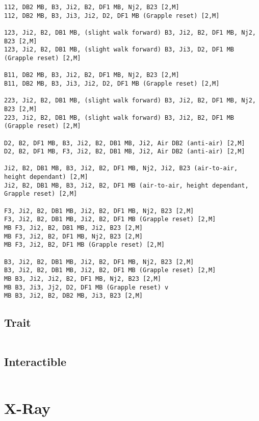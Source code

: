 \documentclass[main.tex]{subfiles}
\begin{document}
\begin{lstlisting}[language=FG]
112, DB2 MB, B3, Ji2, B2, DF1 MB, Nj2, B23 [2,M]
112, DB2 MB, B3, Ji3, Ji2, D2, DF1 MB (Grapple reset) [2,M]

123, Ji2, B2, DB1 MB, (slight walk forward) B3, Ji2, B2, DF1 MB, Nj2, B23 [2,M]
123, Ji2, B2, DB1 MB, (slight walk forward) B3, Ji3, D2, DF1 MB (Grapple reset) [2,M]

B11, DB2 MB, B3, Ji2, B2, DF1 MB, Nj2, B23 [2,M]
B11, DB2 MB, B3, Ji3, Ji2, D2, DF1 MB (Grapple reset) [2,M]

223, Ji2, B2, DB1 MB, (slight walk forward) B3, Ji2, B2, DF1 MB, Nj2, B23 [2,M]
223, Ji2, B2, DB1 MB, (slight walk forward) B3, Ji2, B2, DF1 MB (Grapple reset) [2,M]

D2, B2, DF1 MB, B3, Ji2, B2, DB1 MB, Ji2, Air DB2 (anti-air) [2,M]
D2, B2, DF1 MB, F3, Ji2, B2, DB1 MB, Ji2, Air DB2 (anti-air) [2,M]

Ji2, B2, DB1 MB, B3, Ji2, B2, DF1 MB, Nj2, Ji2, B23 (air-to-air, height dependant) [2,M]
Ji2, B2, DB1 MB, B3, Ji2, B2, DF1 MB (air-to-air, height dependant, Grapple reset) [2,M]

F3, Ji2, B2, DB1 MB, Ji2, B2, DF1 MB, Nj2, B23 [2,M]
F3, Ji2, B2, DB1 MB, Ji2, B2, DF1 MB (Grapple reset) [2,M]
MB F3, Ji2, B2, DB1 MB, Ji2, B23 [2,M]
MB F3, Ji2, B2, DF1 MB, Nj2, B23 [2,M]
MB F3, Ji2, B2, DF1 MB (Grapple reset) [2,M]

B3, Ji2, B2, DB1 MB, Ji2, B2, DF1 MB, Nj2, B23 [2,M]
B3, Ji2, B2, DB1 MB, Ji2, B2, DF1 MB (Grapple reset) [2,M]
MB B3, Ji2, Ji2, B2, DF1 MB, Nj2, B23 [2,M]
MB B3, Ji3, Jj2, D2, DF1 MB (Grapple reset) v
MB B3, Ji2, B2, DB2 MB, Ji3, B23 [2,M]
\end{lstlisting}

\subsection{Trait}
\begin{lstlisting}[language=FG]
\end{lstlisting}


\subsection{Interactible}
\begin{lstlisting}[language=FG]

\end{lstlisting}

\section{X-Ray}
\begin{lstlisting}[language=FG]

\end{lstlisting}
\end{document}
